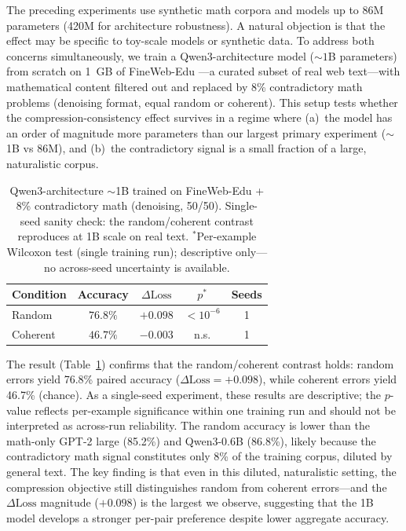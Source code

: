 \documentclass{article}
\begin{document}
The preceding experiments use synthetic math corpora and models up to 86M parameters (420M for architecture robustness). A natural objection is that the effect may be specific to toy-scale models or synthetic data. To address both concerns simultaneously, we train a Qwen3-architecture model (${\sim}1$B parameters) from scratch on 1~GB of FineWeb-Edu \citep{penedo2024fineweb}---a curated subset of real web text---with mathematical content filtered out and replaced by 8\% contradictory math problems (denoising format, equal random or coherent). This setup tests whether the compression-consistency effect survives in a regime where (a)~the model has an order of magnitude more parameters than our largest primary experiment (${\sim}$1B vs 86M), and (b)~the contradictory signal is a small fraction of a large, naturalistic corpus.

\begin{table}[t]
\centering
\begin{tabular}{lcccc}
\toprule
Condition & Accuracy & $\Delta\text{Loss}$ & $p^*$ & Seeds \\
\midrule
Random   & $\mathbf{76.8\%}$ & $+0.098$ & $< 10^{-6}$ & 1 \\
Coherent & $46.7\%$ & $-0.003$ & n.s. & 1 \\
\bottomrule
\end{tabular}
\caption{Qwen3-architecture ${\sim}$1B trained on FineWeb-Edu + 8\% contradictory math (denoising, 50/50). Single-seed sanity check: the random/coherent contrast reproduces at 1B scale on real text. $^*$Per-example Wilcoxon test (single training run); descriptive only---no across-seed uncertainty is available.}
\label{tab:qwen1b}
\end{table}

The result (Table~\ref{tab:qwen1b}) confirms that the random/coherent contrast holds: random errors yield 76.8\% paired accuracy ($\Delta\text{Loss} = +0.098$), while coherent errors yield 46.7\% (chance). As a single-seed experiment, these results are descriptive; the $p$-value reflects per-example significance within one training run and should not be interpreted as across-run reliability. The random accuracy is lower than the math-only GPT-2 large (85.2\%) and Qwen3-0.6B (86.8\%), likely because the contradictory math signal constitutes only 8\% of the training corpus, diluted by general text. The key finding is that even in this diluted, naturalistic setting, the compression objective still distinguishes random from coherent errors---and the $\Delta\text{Loss}$ magnitude ($+0.098$) is the largest we observe, suggesting that the 1B model develops a stronger per-pair preference despite lower aggregate accuracy.
\end{document}
